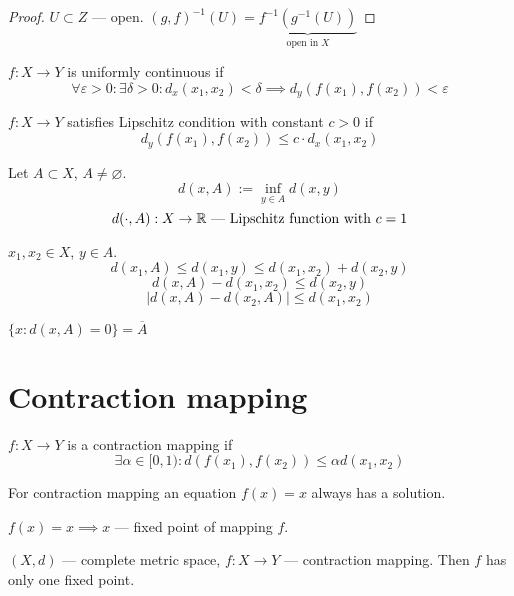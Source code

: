 \begin{proof}
  $U \subset Z$ --- open. $(g, f)^{-1} (U) = \underbrace{f^{-1}(g^{-1}(U))}_{\text{open in } X}$
\end{proof}

\hr

\begin{definition}
  $f: X \to  Y$ is uniformly continuous if
  \[ \forall \varepsilon>0: \exists  \delta > 0: d_x(x_1, x_2) < \delta \implies d_y(f(x_1), f(x_2)) < \varepsilon \] 
\end{definition}

\begin{definition}
  $f: X \to  Y$ satisfies Lipschitz condition with constant $c > 0$ if
  \[ d_y(f(x_1), f(x_2)) \le c \cdot d_x(x_1, x_2) \] 
\end{definition}


\begin{example}
  Let $A \subset X$, $A \neq \varnothing$.
   \[ d(x,A) := \inf_{y \in  A} d(x,y) \] 
\[ d(\cdot,A): X \to  \mathbb{R} \text{ --- Lipschitz function with } c = 1 \] 

$x_1, x_2 \in  X$, $y \in  A$.
\[ d(x_1, A) \le d(x_1, y) \le d(x_1, x_2) + d(x_2, y) \] 
\[ d(x,A) - d(x_1,x_2) \le  d(x_2,y) \] 
\[ \left|  d(x,A) - d(x_2,A) \right| \le d(x_1,x_2) \] 
\end{example}

\begin{exercise}
  $\{x: d(x, A) = 0\} = \overline{A} $
\end{exercise}



\section{Contraction mapping}

\begin{definition}
  $f: X \to  Y$ is a contraction mapping if \[ 
  \exists  \alpha \in  [0,1) : d(f(x_1), f(x_2)) \le \alpha d(x_1,x_2)\] 
\end{definition}

For contraction mapping an equation $f(x) = x$ always has a solution.

$f(x) = x \implies x$ --- fixed point of mapping $f$.

\begin{theorem}
  [Banach]

  $(X,d)$ --- complete metric space, $f: X\to Y$ --- contraction mapping.
  Then $f$ has only one fixed point.
\end{theorem}

